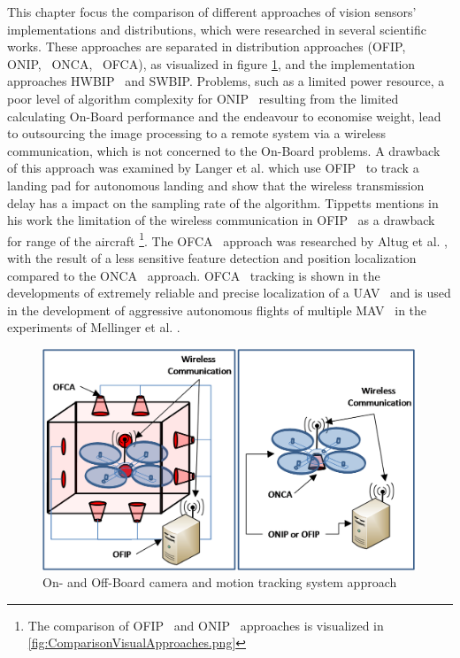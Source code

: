 This chapter focus the comparison of different approaches of vision sensors'
implementations and distributions, which were researched in several scientific
works. These approaches are separated in distribution approaches (\gls{OFIP},~
\gls{ONIP},~ \gls{ONCA},~ 
\gls{OFCA}), as visualized in figure
\ref{fig:Off-vsOn-BoardCamerasIp.png}, and the implementation approaches
\gls{HWBIP}~ and \gls{SWBIP}. Problems, such as a limited power resource, a poor level of
algorithm complexity for \gls{ONIP}~ resulting from the limited calculating On-Board
performance and the endeavour to economise weight, lead to outsourcing the image
processing to a remote system via a wireless communication, which is not
concerned to the On-Board problems. A drawback of this approach was examined by
Langer et al.  which use
\gls{OFIP}~ to track a landing pad for autonomous landing and show that the wireless
transmission delay has a impact on the sampling rate of the algorithm.\newpage
Tippetts  mentions in his work the limitation of the
wireless communication in \gls{OFIP}~ as a drawback for range of the aircraft
\footnote{The comparison of \gls{OFIP}~ and \gls{ONIP}~ approaches is visualized in 
\ref{fig:ComparisonVisualApproaches.png}}. 
The \gls{OFCA}~ approach was researched by
Altug et al. , with the result of a less sensitive feature detection and
position localization compared to the \gls{ONCA}~ approach. \gls{OFCA}~ tracking is shown in
the developments of extremely reliable and precise localization of a \gls{UAV}~ and
is used in the development of aggressive autonomous flights of multiple \gls{MAV}~ in
the experiments of Mellinger et al.  .

\begin{figure}[H]
	\centering
		\includegraphics[width=1\textwidth]{graphic/Off-vsOn-BoardCamerasIp.png}
	\caption{On- and Off-Board camera and motion tracking system approach}
	\label{fig:Off-vsOn-BoardCamerasIp.png}
\end{figure}

